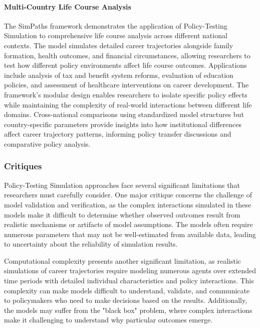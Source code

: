 \documentclass[main.tex]{subfiles}
\begin{document}
\paragraph{Multi-Country Life Course Analysis}

The SimPaths framework demonstrates the application of Policy-Testing Simulation to comprehensive life course analysis across different national contexts\autocite{bronka2023}. The model simulates detailed career trajectories alongside family formation, health outcomes, and financial circumstances, allowing researchers to test how different policy environments affect life course outcomes. Applications include analysis of tax and benefit system reforms, evaluation of education policies, and assessment of healthcare interventions on career development. The framework's modular design enables researchers to isolate specific policy effects while maintaining the complexity of real-world interactions between different life domains. Cross-national comparisons using standardized model structures but country-specific parameters provide insights into how institutional differences affect career trajectory patterns, informing policy transfer discussions and comparative policy analysis.

\subsubsection{Critiques}

Policy-Testing Simulation approaches face several significant limitations that researchers must carefully consider. One major critique concerns the challenge of model validation and verification, as the complex interactions simulated in these models make it difficult to determine whether observed outcomes result from realistic mechanisms or artifacts of model assumptions\autocite{gilbert2018, furtado2023}. The models often require numerous parameters that may not be well-estimated from available data, leading to uncertainty about the reliability of simulation results\autocite{number-analytics1}.

Computational complexity presents another significant limitation, as realistic simulations of career trajectories require modeling numerous agents over extended time periods with detailed individual characteristics and policy interactions\autocite{bullinaria2018, career-model}. This complexity can make models difficult to understand, validate, and communicate to policymakers who need to make decisions based on the results\autocite{gilbert2018}. Additionally, the models may suffer from the "black box" problem, where complex interactions make it challenging to understand why particular outcomes emerge\autocite{furtado2023}.
\end{document}
